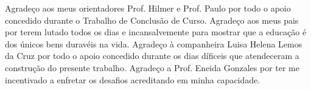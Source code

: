 \begin{agradecimentos}
Agradeço aos meus orientadores Prof.  Hilmer e Prof. Paulo por todo o apoio concedido durante o Trabalho de Conclusão de Curso.
Agradeço aos meus pais por terem lutado todos os dias e incansalvemente para mostrar que a educação é dos únicos bens duravéis na vida.
Agradeço à companheira Luisa Helena Lemos da Cruz por todo o apoio concedido durante os dias díficeis que atendeceram a construção do presente trabalho.
Agradeço a Prof. Eneida Gonzales por ter me incentivado a enfretar os desafios acreditando em minha capacidade.


\end{agradecimentos}
